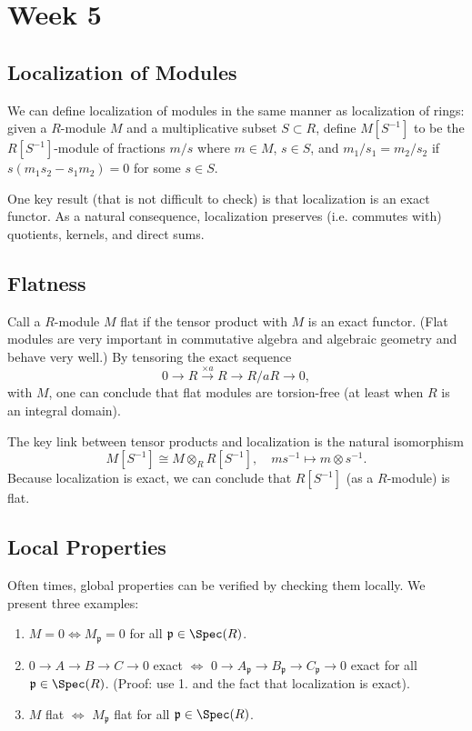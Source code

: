 \section{Week 5}

\subsection{Localization of Modules}
We can define localization of modules in the same manner as localization of rings: given a $R$-module $M$ and a multiplicative subset $S \subset R$, define $M[S^{-1}]$ to be the $R[S^{-1}]$-module of fractions $m/s$ where $m \in M$, $s \in S$, and $m_1/s_1 = m_2/s_2$ if $s(m_1s_2-s_1m_2) = 0$ for some $s \in S$.

One key result (that is not difficult to check) is that localization is an exact functor. As a natural consequence, localization preserves (i.e. commutes with) quotients, kernels, and direct sums.

\subsection{Flatness}
Call a $R$-module $M$ flat if the tensor product with $M$ is an exact functor. (Flat modules are very important in commutative algebra and algebraic geometry and behave very well.) By tensoring the exact sequence
\[
    0 \to R \xrightarrow{\times a} R \to R/aR \to 0,
\]
with $M$, one can conclude that flat modules are torsion-free (at least when $R$ is an integral domain).

The key link between tensor products and localization is the natural isomorphism
\[
    M[S^{-1}] \cong M \otimes_R R[S^{-1}], \quad ms^{-1} \mapsto m \otimes s^{-1}.
\]
Because localization is exact, we can conclude that $R[S^{-1}]$ (as a $R$-module) is flat.

\subsection{Local Properties}
Often times, global properties can be verified by checking them locally. We present three examples:
\begin{enumerate}
    \item $M = 0 \iff M_{\mathfrak p} = 0$ for all $\mathfrak p \in \Spec(R)$.
    \item $0 \to A \to B \to C \to 0$ exact $\iff$ $0 \to A_{\mathfrak p} \to B_{\mathfrak p} \to C_{\mathfrak p} \to 0$ exact for all $\mathfrak p \in \Spec(R)$. (Proof: use 1. and the fact that localization is exact).
    \item $M$ flat $\iff$ $M_{\mathfrak p}$ flat for all $\mathfrak p \in \Spec(R)$.
\end{enumerate}

